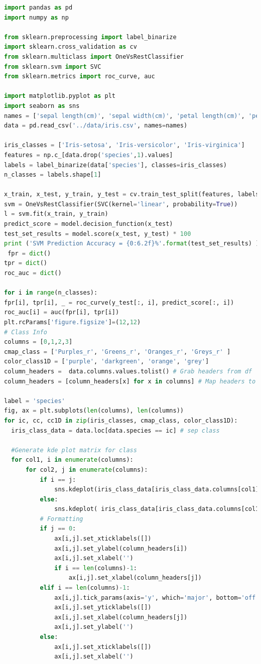 \documentclass[jair,twoside,11pt,theapa]{article}
\begin{document}
\begin{lstlisting}[language=python]
import pandas as pd
import numpy as np

from sklearn.preprocessing import label_binarize
import sklearn.cross_validation as cv
from sklearn.multiclass import OneVsRestClassifier
from sklearn.svm import SVC
from sklearn.metrics import roc_curve, auc

import matplotlib.pyplot as plt
import seaborn as sns
names = ['sepal length(cm)', 'sepal width(cm)', 'petal length(cm)', 'petal width(cm)', 'species']
data = pd.read_csv('../data/iris.csv', names=names)

iris_classes = ['Iris-setosa', 'Iris-versicolor', 'Iris-virginica']
features = np.c_[data.drop('species',1).values]
labels = label_binarize(data['species'], classes=iris_classes)
n_classes = labels.shape[1]

x_train, x_test, y_train, y_test = cv.train_test_split(features, labels, test_size=0.25)
svm = OneVsRestClassifier(SVC(kernel='linear', probability=True))
l = svm.fit(x_train, y_train)
predict_score = model.decision_function(x_test)
test_set_results = model.score(x_test, y_test) * 100
print ('SVM Prediction Accuracy = {0:6.2f}%'.format(test_set_results) )
 fpr = dict()
tpr = dict()
roc_auc = dict()

for i in range(n_classes):
fpr[i], tpr[i], _ = roc_curve(y_test[:, i], predict_score[:, i])
roc_auc[i] = auc(fpr[i], tpr[i])
plt.rcParams['figure.figsize']=(12,12)
# Class Info
columns = [0,1,2,3]
cmap_class = ['Purples_r', 'Greens_r', 'Oranges_r', 'Greys_r' ]
color_class1D = ['purple', 'darkgreen', 'orange', 'grey']
column_headers =  data.columns.values.tolist() # Grab headers from df
column_headers = [column_headers[x] for x in columns] # Map headers to indices selected

label = 'species'
fig, ax = plt.subplots(len(columns), len(columns))
for ic, cc, cc1D in zip(iris_classes, cmap_class, color_class1D): 
  iris_class_data = data.loc[data.species == ic] # sep class
   
  #Generate kde plot matrix for class
  for col1, i in enumerate(columns):
      for col2, j in enumerate(columns):
          if i == j:
              sns.kdeplot(iris_class_data[iris_class_data.columns[col1]], ax=ax[col1][col2], color=cc1D, shade=True, legend=False)
          else:
              sns.kdeplot( iris_class_data[iris_class_data.columns[col1]], iris_class_data[iris_class_data.columns[col2]], ax=ax[col1][col2], cmap=cc)    
          # Formatting
          if j == 0:
              ax[i,j].set_xticklabels([])
              ax[i,j].set_ylabel(column_headers[i])
              ax[i,j].set_xlabel('')
              if i == len(columns)-1:
                  ax[i,j].set_xlabel(column_headers[j])
          elif i == len(columns)-1:
              ax[i,j].tick_params(axis='y', which='major', bottom='off')
              ax[i,j].set_yticklabels([])
              ax[i,j].set_xlabel(column_headers[j])
              ax[i,j].set_ylabel('')                
          else:
              ax[i,j].set_xticklabels([])
              ax[i,j].set_xlabel('')
              

\end{lstlisting}
\end{document}
